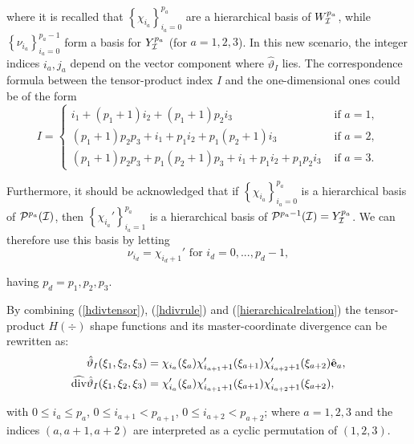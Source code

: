 \noindent where it is recalled that $\left\{\chi_{i_a}\right\}_{i_a=0}^{p_a}$ are a hierarchical basis of $W^{p_a}_{\mathcal{I}}$, while $\left\{\nu_{i_a}\right\}_{i_a=0}^{p_a-1}$ form a basis for $Y^{p_a}_{\mathcal{I}}$ (for $a=1,2,3$). In this new scenario, the integer indices $i_a,j_a$ depend on the vector component where $\hat{\vartheta}_I$ lies. The correspondence formula between the tensor-product index $I$ and the one-dimensional ones could be of the form
\begin{equation}
    I=  \begin{cases}
            i_1+(p_1+1)i_2+(p_1+1)p_2i_3 & \text{ if }a=1,\\
            (p_1+1)p_2p_3+i_1+p_1i_2+p_1(p_2+1)i_3 & \text{ if }a=2,\\
            (p_1+1)p_2p_3+p_1(p_2+1)p_3+i_1+p_1i_2+p_1p_2i_3 & \text{ if }a=3.
        \end{cases}
        \label{hdivtensorindex}
\end{equation}

Furthermore, it should be acknowledged that if $\left\{\chi_{i_a}\right\}_{i_a=0}^{p_a}$ is a hierarchical basis of $\mathcal{P}^{p_a}(\mathcal{I})$, then $\left\{\chi_{i_a}'\right\}_{i_a=1}^{p_a}$ is a hierarchical basis of $\mathcal{P}^{p_a-1}(\mathcal{I})=Y^{p_a}_{\mathcal{I}}$. We can therefore use this basis by letting 
\begin{equation}
    \nu_{i_d}=\chi_{i_d+1}'\text{ for }i_d=0,...,p_d-1,
    \label{hierarchicalrelation}
\end{equation}

\noindent having $p_d=p_1,p_2,p_3$.

By combining (\ref{hdivtensor}), (\ref{hdivrule}) and (\ref{hierarchicalrelation}) the tensor-product $H(\div)$ shape functions and its master-coordinate divergence can be rewritten as:
\begin{align}
    \hat{\vartheta}_I(\xi_1,\xi_2,\xi_3)&= \chi_{i_a}(\xi_a)\chi_{i_{a+1}+1}'(\xi_{a+1})\chi_{i_{a+2}+1}'(\xi_{a+2})\hat{\mathbf{e}}_a,\label{divtensor0}\\
    \widehat{\operatorname{div}}\hat{\vartheta}_I(\xi_1,\xi_2,\xi_3)&= \chi_{i_a}'(\xi_a)\chi_{i_{a+1}+1}'(\xi_{a+1})\chi_{i_{a+2}+1}'(\xi_{a+2})
    ,\label{divtensor1}
\end{align}

\noindent with $0\leq i_a\leq p_a$, $0\leq i_{a+1}<p_{a+1}$, $0\leq i_{a+2}<p_{a+2}$; where $a=1,2,3$ and the indices $(a,a+1,a+2)$ are interpreted as a cyclic permutation of $(1,2,3)$.

